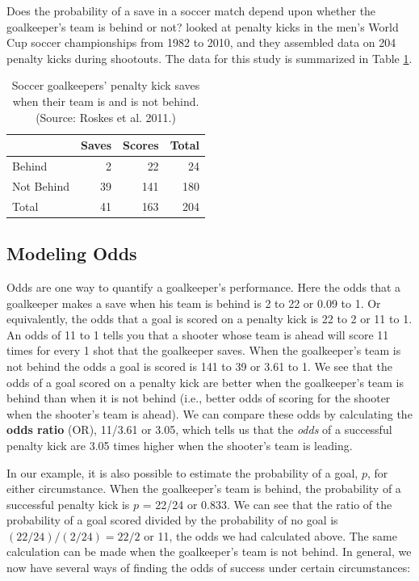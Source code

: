 \documentclass[
]{krantz}
\begin{document}
Does the probability of a save in a soccer match depend upon whether the goalkeeper's team is behind or not? \citet{Roskes2011} looked at penalty kicks in the men's World Cup soccer championships from 1982 to 2010, and they assembled data on 204 penalty kicks during shootouts. The data for this study is summarized in Table \ref{tab:table1chp6}.

\begin{table}

\caption{\label{tab:table1chp6}Soccer goalkeepers' penalty kick saves when their team is and is not behind.  (Source: Roskes et al. 2011.)}
\centering
\begin{tabular}[t]{lrrr}
\toprule
  & Saves & Scores & Total\\
\midrule
Behind & 2 & 22 & 24\\
Not Behind & 39 & 141 & 180\\
Total & 41 & 163 & 204\\
\bottomrule
\end{tabular}
\end{table}

\hypertarget{modeling-odds}{%
\subsection{Modeling Odds}\label{modeling-odds}}

Odds are one way to quantify a goalkeeper's performance. Here the odds that a goalkeeper makes a save when his team is behind is 2 to 22 or 0.09 to 1. Or equivalently, the odds that a goal is scored on a penalty kick is 22 to 2 or 11 to 1. An odds of 11 to 1 tells you that a shooter whose team is ahead will score 11 times for every 1 shot that the goalkeeper saves. When the goalkeeper's team is not behind the odds a goal is scored is 141 to 39 or 3.61 to 1. We see that the odds of a goal scored on a penalty kick are better when the goalkeeper's team is behind than when it is not behind (i.e., better odds of scoring for the shooter when the shooter's team is ahead). We can compare these odds by calculating the \textbf{odds ratio}  (OR), 11/3.61 or 3.05, which tells us that the \emph{odds} of a successful penalty kick are 3.05 times higher when the shooter's team is leading.

In our example, it is also possible to estimate the probability of a goal, \(p\), for either circumstance. When the goalkeeper's team is behind, the probability of a successful penalty kick is \(p\) = 22/24 or 0.833. We can see that the ratio of the probability of a goal scored divided by the probability of no goal is \((22/24)/(2/24)=22/2\) or 11, the odds we had calculated above. The same calculation can be made when the goalkeeper's team is not behind. In general, we now have several ways of finding the odds of success under certain circumstances:
\end{document}
